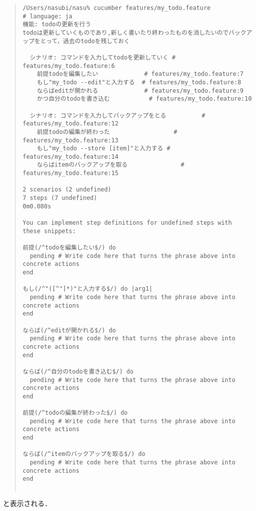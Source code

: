 \begin{quote}\begin{verbatim}
/Users/nasubi/nasu% cucumber features/my_todo.feature 
# language: ja
機能: todoの更新を行う
todoは更新していくものであり,新しく書いたり終わったものを消したいのでバックアップをとって，過去のtodoを残しておく

  シナリオ: コマンドを入力してtodoを更新していく # features/my_todo.feature:6
    前提todoを編集したい             # features/my_todo.feature:7
    もし"my_todo --edit"と入力する  # features/my_todo.feature:8
    ならばeditが開かれる             # features/my_todo.feature:9
    かつ自分のtodoを書き込む           # features/my_todo.feature:10

  シナリオ: コマンドを入力してバックアップをとる          # features/my_todo.feature:12
    前提todoの編集が終わった                  # features/my_todo.feature:13
    もし"my_todo --store [item]"と入力する # features/my_todo.feature:14
    ならばitemのバックアップを取る               # features/my_todo.feature:15

2 scenarios (2 undefined)
7 steps (7 undefined)
0m0.080s

You can implement step definitions for undefined steps with these snippets:

前提(/^todoを編集したい$/) do
  pending # Write code here that turns the phrase above into concrete actions
end

もし(/^"([^"]*)"と入力する$/) do |arg1|
  pending # Write code here that turns the phrase above into concrete actions
end

ならば(/^editが開かれる$/) do
  pending # Write code here that turns the phrase above into concrete actions
end

ならば(/^自分のtodoを書き込む$/) do
  pending # Write code here that turns the phrase above into concrete actions
end

前提(/^todoの編集が終わった$/) do
  pending # Write code here that turns the phrase above into concrete actions
end

ならば(/^itemのバックアップを取る$/) do
  pending # Write code here that turns the phrase above into concrete actions
end


\end{verbatim}\end{quote}
と表示される．

